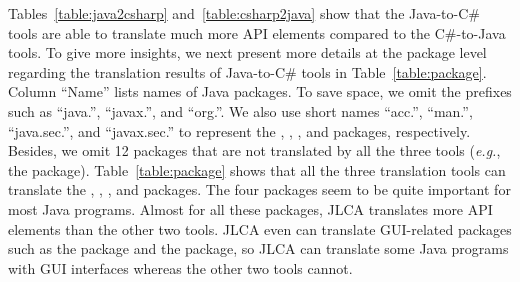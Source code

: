 Tables~\ref{table:java2csharp} and~\ref{table:csharp2java} show that the Java-to-C\# tools are able to translate much more API elements compared to the C\#-to-Java tools. To give more insights, we next present more details at the package level regarding the translation results of Java-to-C\# tools in Table~\ref{table:package}. Column ``Name'' lists names of Java packages. To save space, we omit the prefixes such as ``java.'', ``javax.'', and ``org.''. We also use short names ``acc.'', ``man.'', ``java.sec.'', and ``javax.sec.'' to represent the , , , and  packages, respectively. Besides, we omit 12 packages that are not translated by all the three tools (\emph{e.g.}, the  package). Table~\ref{table:package} shows that all the three translation tools can translate the , , , and  packages. The four packages seem to be quite important for most Java programs. Almost for all these packages, JLCA translates more API elements than the other two tools. JLCA even can translate GUI-related packages such as the  package and the  package, so JLCA can translate some Java programs with GUI interfaces whereas the other two tools cannot.
